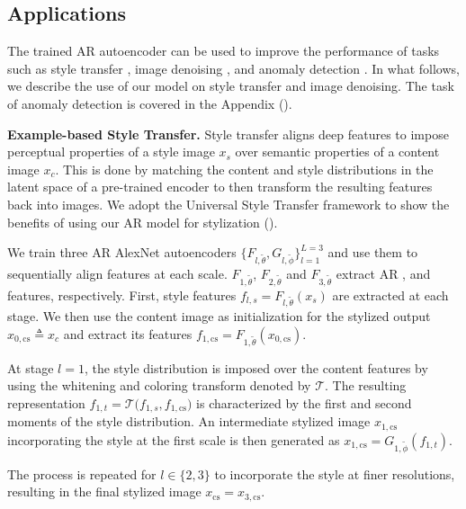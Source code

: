 \subsection{Applications}
\label{sec:applications}

The trained AR autoencoder can be used to improve the performance of tasks such as style transfer \cite{li_2017_universal}, image denoising \cite{vincent_2010_stacked}, and anomaly detection \cite{deecke_2018_image}. In what follows, we describe the use of our model on style transfer and image denoising. The task of anomaly detection is covered in the Appendix ().

\textbf{Example-based Style Transfer.} Style transfer \cite{gatys_2016_image} aligns deep features to impose perceptual properties of a style image $x_{s}$ over semantic properties of a content image $x_{c}$. This is done by matching the content and style distributions in the latent space of a pre-trained encoder to then transform the resulting features back into images. We adopt the Universal Style Transfer framework \cite{li_2017_universal} to show the benefits of using our AR model for stylization ().




We train three AR AlexNet autoencoders $\{F_{l,\tilde{\theta}}, G_{l,\tilde{\phi}}\}_{l=1}^{L=3}$ and use them to sequentially align features at each scale. $F_{1,\tilde{\theta}}$, $F_{2,\tilde{\theta}}$ and $F_{3,\tilde{\theta}}$ extract AR ,  and  features, respectively. First, style features $f_{l,s}=F_{l,\tilde{\theta}}(x_{s})$ are extracted at each stage. We then use the content image as initialization for the stylized output $x_{0,\text{cs}}\triangleq x_{c}$ and extract its  features $f_{1,\text{cs}}=F_{1,\tilde{\theta}}(x_{0,\text{cs}})$.

At stage $l=1$, the style distribution is imposed over the content features by using the whitening and coloring transform \cite{li_2017_universal,kessy_2018_optimal} denoted by $\mathcal{T}$. The resulting representation $f_{1,t}= \mathcal{T}\big(f_{1,s},f_{1,\text{cs}}\big)$ is characterized by the first and second moments of the style distribution. An intermediate stylized image $x_{1,\text{cs}}$ incorporating the style at the first scale is then generated as $x_{1,\text{cs}}= G_{1,\tilde{\phi}}(f_{1,t})$.

The process is repeated for $l\in \{2,3\}$ to incorporate the style at finer resolutions, resulting in the final stylized image $x_{\text{cs}}= x_{3,\text{cs}}$.


